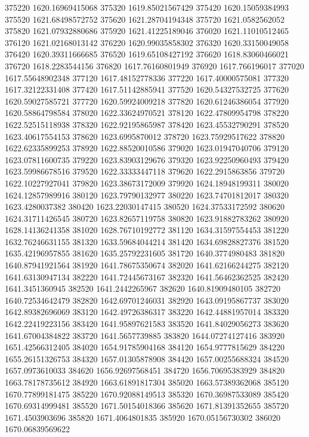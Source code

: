 {375220 1620.16969415068
375320 1619.85021567429
375420 1620.15059384993
375520 1621.68498572752
375620 1621.28704194348
375720 1621.0582562052
375820 1621.07932880686
375920 1621.41225189046
376020 1621.11010512465
376120 1621.02168013142
376220 1620.99035858302
376320 1620.33150049058
376420 1620.39311666685
376520 1619.65108427192
376620 1618.83060466021
376720 1618.2283544156
376820 1617.76160801949
376920 1617.766196017
377020 1617.55648902348
377120 1617.48152778336
377220 1617.40000575081
377320 1617.32122331408
377420 1617.51142885941
377520 1620.54327532725
377620 1620.59027585721
377720 1620.59924009218
377820 1620.61246386054
377920 1620.58864798584
378020 1622.33624970521
378120 1622.47809954798
378220 1622.52515118938
378320 1622.92195865987
378420 1623.45532790291
378520 1623.40617554153
378620 1623.6995870012
378720 1623.75929517622
378820 1622.62335899253
378920 1622.88520010586
379020 1623.01947040706
379120 1623.07811600735
379220 1623.83903129676
379320 1623.92250960493
379420 1623.59986678516
379520 1622.33333447118
379620 1622.2915863856
379720 1622.10227927041
379820 1623.38673172009
379920 1624.18948199311
380020 1624.12857989916
380120 1623.79790132977
380220 1623.74701812017
380320 1623.4280037382
380420 1623.22030147415
380520 1624.37533172592
380620 1624.31711426545
380720 1623.82657119758
380820 1623.91882783262
380920 1628.14136241358
381020 1628.76710192772
381120 1634.31597554453
381220 1632.76246631155
381320 1633.59684044214
381420 1634.69828827376
381520 1635.42196957855
381620 1635.25792231605
381720 1640.3774980483
381820 1640.87941921564
381920 1641.78675350674
382020 1641.62166244275
382120 1641.63130947134
382220 1641.72445673167
382320 1641.56462362525
382420 1641.3451360945
382520 1641.2442265967
382620 1640.81909480105
382720 1640.72534642479
382820 1642.69701246031
382920 1643.09195867737
383020 1642.89382696069
383120 1642.49726386317
383220 1642.44881957014
383320 1642.22419223156
383420 1641.95897621583
383520 1641.84029056273
383620 1641.67004384822
383720 1641.5657739885
383820 1644.07274127416
383920 1651.42566312405
384020 1654.91785904168
384120 1654.9777815629
384220 1655.26151326753
384320 1657.01305878908
384420 1657.00255688324
384520 1657.0973610033
384620 1656.92697568451
384720 1656.70695383929
384820 1663.78178735612
384920 1663.61891817304
385020 1663.57389362068
385120 1670.77899181475
385220 1670.92088149513
385320 1670.36987533089
385420 1670.69314999481
385520 1671.50154018366
385620 1671.81391352655
385720 1671.4503903696
385820 1671.4064801835
385920 1670.05156730302
386020 1670.06839569622
}
